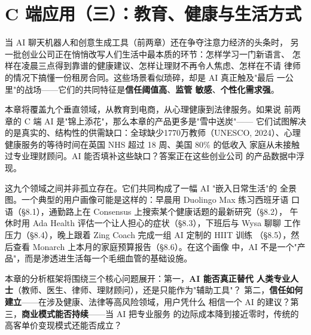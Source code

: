 \chapter{C 端应用（三）：教育、健康与生活方式}
\label{ch:consumer-life}

%

当 AI 聊天机器人和创意生成工具（前两章）还在争夺注意力经济的头条时，
另一批创业公司正在悄悄改写人们生活中最本质的环节：怎样学习一门新语言、
怎样在凌晨三点得到靠谱的健康建议、怎样让理财不再令人焦虑、怎样在不请
律师的情况下搞懂一份租房合同。这些场景看似琐碎，却是 AI 真正触及"最后
一公里"的战场——它们的共同特征是\textbf{信任阈值高}、\textbf{监管
敏感}、\textbf{个性化需求强}。

本章将覆盖九个垂直领域，从教育到电商，从心理健康到法律服务。如果说
前两章的 C 端 AI 是"锦上添花"，那么本章的产品更多是"雪中送炭"——
它们试图解决的是真实的、结构性的供需缺口：全球缺少1770万教师（UNESCO,
2024）、心理健康服务的等待时间在英国 NHS 超过 18 周、美国 80\% 的低收入
家庭从未接触过专业理财顾问。AI 能否填补这些缺口？答案正在这些创业公司
的产品数据中浮现。

这九个领域之间并非孤立存在。它们共同构成了一幅 AI "嵌入日常生活"的
全景图。一个典型的用户画像可能是这样的：早晨用 Duolingo Max 练习西班牙语
口语（§8.1），通勤路上在 Consensus 上搜索某个健康话题的最新研究（§8.2），
午休时用 Ada Health 评估一个让人担心的症状（§8.3），下班后与 Wysa 聊聊
工作压力（§8.4），晚上跟着 Zing Coach 完成一组 AI 定制的 HIIT 训练
（§8.5），然后查看 Monarch 上本月的家庭预算报告（§8.6）。在这个画像
中，AI 不是一个"产品"，而是渗透进生活每一个毛细血管的基础设施。

本章的分析框架将围绕三个核心问题展开：第一，\textbf{AI 能否真正替代
人类专业人士}（教师、医生、律师、理财顾问），还是只能作为"辅助工具"？
第二，\textbf{信任如何建立}——在涉及健康、法律等高风险领域，用户凭什么
相信一个 AI 的建议？第三，\textbf{商业模式能否持续}——当 AI 把专业服务
的边际成本降到接近零时，传统的高客单价变现模式还能否成立？

